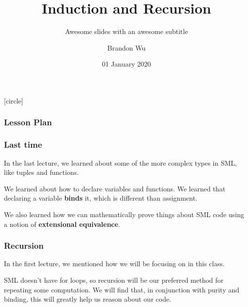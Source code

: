 \documentclass[aspectratio=169]{beamer}
\title{Induction and Recursion} %
\subtitle{Awesome slides with an awesome subtitle} %
\date{01 January 2020} %
\author{Brandon Wu} %
\newif\ifcolorlambda
\begin{document}
\ifweb
    \renewcommand{\pause}{}
\fi

[circle]

{
\begin{frame}[plain]
    \colorlambdatrue
    \titlepage
\end{frame}
}

\begin{frame}[fragile]
  \frametitle{Lesson Plan}

  \tableofcontents
\end{frame}

\begin{frame}[fragile]
  \frametitle{Last time}

  In the last lecture, we learned about some of the more complex types in 
  SML, like tuples and functions. 

  \vspace{\fill}
  
  We learned about how to declare variables and functions. We learned that declaring
  a variable \textbf{binds} it, which is different than assignment. 
  
  \vspace{\fill}

  We also learned how we can mathematically prove things 
  about SML code using a notion of \textbf{extensional equivalence}. 
\end{frame}


\begin{frame}[fragile]
  \frametitle{Recursion}

  In the first lecture, we mentioned how we will be focusing on
   in this class.

  \vspace{\fill}


  \vspace{5pt}


  \vspace{\fill}

  SML doesn't have for loops, so recursion will be our preferred method
  for repeating some computation. We will find that, in conjunction with
  purity and binding, this will greatly help us reason about our code. 
\end{frame}
\end{document}

